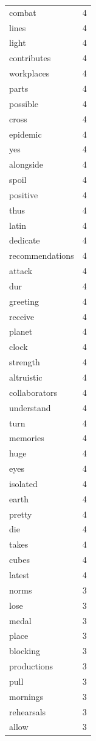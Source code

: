 \begin{tabular}{lr}
combat & 4 \\
lines & 4 \\
light & 4 \\
contributes & 4 \\
workplaces & 4 \\
parts & 4 \\
possible & 4 \\
cross & 4 \\
epidemic & 4 \\
yes & 4 \\
alongside & 4 \\
spoil & 4 \\
positive & 4 \\
thus & 4 \\
latin & 4 \\
dedicate & 4 \\
recommendations & 4 \\
attack & 4 \\
dur & 4 \\
greeting & 4 \\
receive & 4 \\
planet & 4 \\
clock & 4 \\
strength & 4 \\
altruistic & 4 \\
collaborators & 4 \\
understand & 4 \\
turn & 4 \\
memories & 4 \\
huge & 4 \\
eyes & 4 \\
isolated & 4 \\
earth & 4 \\
pretty & 4 \\
die & 4 \\
takes & 4 \\
cubes & 4 \\
latest & 4 \\
norms & 3 \\
lose & 3 \\
medal & 3 \\
place & 3 \\
blocking & 3 \\
productions & 3 \\
pull & 3 \\
mornings & 3 \\
rehearsals & 3 \\
allow & 3 \\

\end{tabular}
